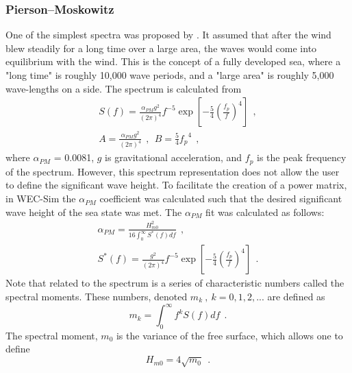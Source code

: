 \subsubsection{Pierson--Moskowitz}
One of the simplest spectra was proposed by \cite{PM}. It assumed that after the wind blew steadily for a long time over a large area, the waves would come into equilibrium with the wind. This is the concept of a fully developed sea, where a "long time" is roughly 10,000 wave periods, and a "large area" is roughly 5,000 wave-lengths on a side.  The spectrum is calculated from
\begin{eqnarray}
& S\left( f \right) = \frac{\alpha_{PM}g^{2}}{\left( 2 \pi \right)^{4}}f^{-5}\exp\left[-\frac{5}{4} \left( \frac{f_{p}}{f}\right)^{4} \right]~~, &\\
& A = \frac{\alpha_{PM}g^{2}}{\left( 2 \pi \right)^{4}}~~, ~~ B = \frac{5}{4} {f_{p}}^{4}~~, &
\end{eqnarray}
where $\alpha_{PM}$ = 0.0081, $g$ is gravitational acceleration, and $f_{p}$ is the peak frequency of the spectrum.  However, this spectrum representation does not allow the user to define the significant wave height.  To facilitate the creation of a power matrix, in WEC-Sim the $\alpha_{PM}$ coefficient was calculated such that the desired significant wave height of the sea state was met.  The $\alpha_{PM}$ fit was calculated as follows:
\begin{eqnarray}
&\alpha_{PM} = \frac{H_{m0}^{2}}{16\int_{0}^{\infty} S^{*} \left( f \right) df}~~,&\\
& S^{*}\left( f \right) = \frac{ g^{2} }{ (2\pi)^{4}} f^{-5}\exp\left[-\frac{5}{4} \left( \frac{f_{p}}{f}\right)^{4} \right]~~. &
\end{eqnarray}
Note that related to the spectrum is a series of characteristic numbers called the spectral moments. These numbers, denoted $m_{k}~,~k=0, 1, 2,...$ are defined as
\begin{equation}
m_{k} = \int_{0}^{\infty} f^{k} S \left( f \right) df ~~.
\end{equation}
The spectral moment, $m_{0}$ is the variance of the free surface, which allows one to define
\begin{equation}
H_{m0} = 4 \sqrt{m_{0}}~~.
\end{equation}

